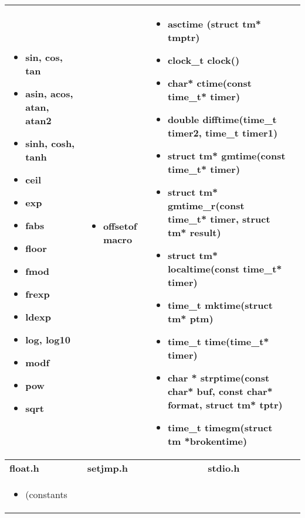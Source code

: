 \begin{table*}[h]
\begin{tabular}{|p{3cm}|p{3cm}|p{3cm}|p{6.5cm}|}
\begin{itemize}
\setlength{\itemsep}{0cm}
\setlength{\parskip}{0cm}
	\item sin, cos, tan
	\item asin, acos, atan, atan2
	\item sinh, cosh, tanh
	\item ceil
	\item exp
	\item fabs
	\item floor
	\item fmod
	\item frexp
	\item ldexp
	\item log, log10
	\item modf
	\item pow
	\item sqrt
\end{itemize}
 &  \begin{itemize}
	\item offsetof macro
\end{itemize}
 &  \begin{itemize}
\setlength{\itemsep}{0cm}
\setlength{\parskip}{0cm}
	\item asctime (struct tm* tmptr)
	\item clock\_t clock()
	\item char* ctime(const time\_t* timer)
	\item double difftime(time\_t timer2, time\_t timer1)
	\item struct tm* gmtime(const time\_t* timer)
	\item struct tm* gmtime\_r(const time\_t* timer, struct tm* result)
	\item struct tm* localtime(const time\_t* timer)
	\item time\_t mktime(struct tm* ptm)
	\item time\_t time(time\_t* timer)
	\item char * strptime(const char* buf, const char* format, struct tm* tptr)
	\item time\_t timegm(struct tm *brokentime)
\end{itemize}
 \\ \hline
		\textbf{ float.h} & \textbf{ setjmp.h} & \multicolumn{2}{|c|}{\textbf{ stdio.h}} \\ \hline
		 \begin{itemize}
\setlength{\itemsep}{0cm}
\setlength{\parskip}{0cm}
	\item (constants
\end{itemize}
 &  \begin{itemize}

\end{itemize}
\end{tabular}
\end{table*}
